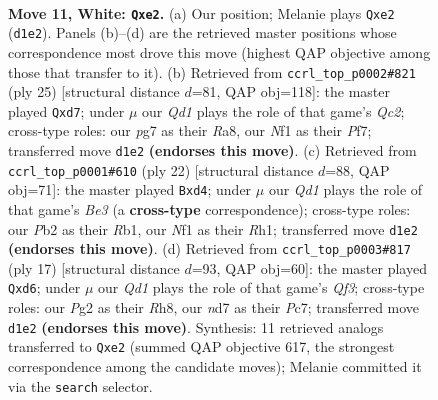 \documentclass[11pt]{article}
\begin{document}
\clearpage

\begin{figure}[p]\centering
\begin{subfigure}{0.46\textwidth}\centering
\resizebox{\linewidth}{!}{%
\newchessgame
\chessboard[
  setfen={r1b1kb1r/pp1n1ppp/1q2p3/3pP3/5P2/8/PP2n1PP/R1BQKNNR w KQkq - 0 11},
  showmover=false,
  pgfstyle=straightmove, color=movearrow, markmove={d1-e2}
]}
\caption{}
\end{subfigure}\hfill
\begin{subfigure}{0.46\textwidth}\centering
\resizebox{\linewidth}{!}{%
\newchessgame
\chessboard[
  setfen={r3kb1r/ppqN1ppp/2p1pn2/8/3P4/1Q4P1/PP2PP1P/R1B1KB1R b KQkq - 0 13},
  showmover=false,
  pgfstyle=straightmove, color=movearrow, markmove={c7-d7}
]}
\caption{}
\end{subfigure}
\\[4pt]
\begin{subfigure}{0.46\textwidth}\centering
\resizebox{\linewidth}{!}{%
\newchessgame
\chessboard[
  setfen={r1b1kb1r/pp1n1ppp/4p3/1B1pP3/3n1P2/q1N1B3/P1PQ2PP/1R2K2R w Kkq - 0 12},
  showmover=false,
  pgfstyle=straightmove, color=movearrow, markmove={e3-d4}
]}
\caption{}
\end{subfigure}\hfill
\begin{subfigure}{0.46\textwidth}\centering
\resizebox{\linewidth}{!}{%
\newchessgame
\chessboard[
  setfen={r1b1k2r/pppp1ppp/2nN1q2/8/2Q1P3/8/PPP2PPP/R1B1KB1R b KQkq - 0 9},
  showmover=false,
  pgfstyle=straightmove, color=movearrow, markmove={f6-d6}
]}
\caption{}
\end{subfigure}
\caption{\textbf{Move 11, White: \texttt{Qxe2}.} (a) Our position; Melanie plays \texttt{Qxe2} (\texttt{d1e2}). Panels (b)--(d) are the retrieved master positions whose correspondence most drove this move (highest QAP objective among those that transfer to it). (b) Retrieved from \texttt{ccrl\_top\_p0002\#821} (ply 25) [structural distance $d$=81, QAP obj=118]: the master played \texttt{Qxd7}; under $\mu$ our \emph{Qd1} plays the role of that game's \emph{Qc2}; cross-type roles: our \emph{p}g7 as their \emph{R}a8, our \emph{N}f1 as their \emph{P}f7; transferred move \texttt{d1e2} \textbf{(endorses this move)}. (c) Retrieved from \texttt{ccrl\_top\_p0001\#610} (ply 22) [structural distance $d$=88, QAP obj=71]: the master played \texttt{Bxd4}; under $\mu$ our \emph{Qd1} plays the role of that game's \emph{Be3} (a \textbf{cross-type} correspondence); cross-type roles: our \emph{P}b2 as their \emph{R}b1, our \emph{N}f1 as their \emph{R}h1; transferred move \texttt{d1e2} \textbf{(endorses this move)}. (d) Retrieved from \texttt{ccrl\_top\_p0003\#817} (ply 17) [structural distance $d$=93, QAP obj=60]: the master played \texttt{Qxd6}; under $\mu$ our \emph{Qd1} plays the role of that game's \emph{Qf3}; cross-type roles: our \emph{P}g2 as their \emph{R}h8, our \emph{n}d7 as their \emph{P}c7; transferred move \texttt{d1e2} \textbf{(endorses this move)}. Synthesis: 11 retrieved analogs transferred to \texttt{Qxe2} (summed QAP objective 617, the strongest correspondence among the candidate moves); Melanie committed it via the \texttt{search} selector.}
\label{fig:thought-m20}
\end{figure}
\end{document}

